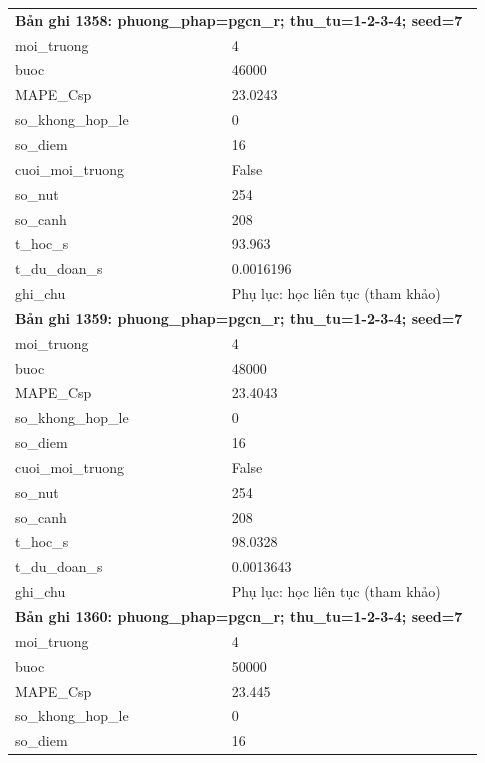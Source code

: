 \begin{longtable}{p{0.43\linewidth}p{0.50\linewidth}}
\midrule
\multicolumn{2}{p{0.95\linewidth}}{\textbf{Bản ghi 1358: phuong\_phap=pgcn\_r; thu\_tu=1-2-3-4; seed=7}} \\
moi\_\allowbreak truong & 4 \\
buoc & 46000 \\
MAPE\_\allowbreak Csp & 23.0243 \\
so\_\allowbreak khong\_\allowbreak hop\_\allowbreak le & 0 \\
so\_\allowbreak diem & 16 \\
cuoi\_\allowbreak moi\_\allowbreak truong & False \\
so\_\allowbreak nut & 254 \\
so\_\allowbreak canh & 208 \\
t\_\allowbreak hoc\_\allowbreak s & 93.963 \\
t\_\allowbreak du\_\allowbreak doan\_\allowbreak s & 0.0016196 \\
ghi\_\allowbreak chu & Phụ lục: học liên tục (tham khảo) \\
\midrule
\multicolumn{2}{p{0.95\linewidth}}{\textbf{Bản ghi 1359: phuong\_phap=pgcn\_r; thu\_tu=1-2-3-4; seed=7}} \\
moi\_\allowbreak truong & 4 \\
buoc & 48000 \\
MAPE\_\allowbreak Csp & 23.4043 \\
so\_\allowbreak khong\_\allowbreak hop\_\allowbreak le & 0 \\
so\_\allowbreak diem & 16 \\
cuoi\_\allowbreak moi\_\allowbreak truong & False \\
so\_\allowbreak nut & 254 \\
so\_\allowbreak canh & 208 \\
t\_\allowbreak hoc\_\allowbreak s & 98.0328 \\
t\_\allowbreak du\_\allowbreak doan\_\allowbreak s & 0.0013643 \\
ghi\_\allowbreak chu & Phụ lục: học liên tục (tham khảo) \\
\midrule
\multicolumn{2}{p{0.95\linewidth}}{\textbf{Bản ghi 1360: phuong\_phap=pgcn\_r; thu\_tu=1-2-3-4; seed=7}} \\
moi\_\allowbreak truong & 4 \\
buoc & 50000 \\
MAPE\_\allowbreak Csp & 23.445 \\
so\_\allowbreak khong\_\allowbreak hop\_\allowbreak le & 0 \\
so\_\allowbreak diem & 16 \\

\end{longtable}
